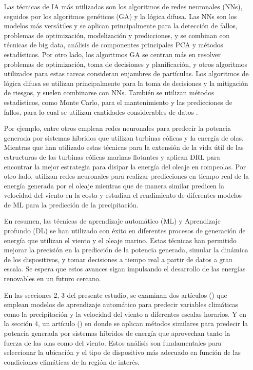 \documentclass[12pt]{article}
\begin{document}
Las técnicas de IA más utilizadas son los algoritmos de redes neuronales (NNs), seguidos por los algoritmos genéticos (GA) y la lógica difusa. Las NNs son los modelos más versátiles y se aplican principalmente para la detección de fallos, problemas de optimización, modelización y predicciones, y se combinan con técnicas de big data, análisis de componentes principales PCA y métodos estadísticos. Por otro lado, los algoritmos GA se centran más en resolver problemas de optimización, toma de decisiones y planificación, y otros algoritmos utilizados para estas tareas consideran enjambres de partículas. Los algoritmos de lógica difusa se utilizan principalmente para la toma de decisiones y la mitigación de riesgos, y suelen combinarse con NNs. También se utilizan métodos estadísticos, como Monte Carlo, para el mantenimiento y las predicciones de fallos, para lo cual se utilizan cantidades considerables de datos \citep{Garcia}.

Por ejemplo, \citet{Mahsa, Chen,Zheng} entre otros emplean redes neuronales para predecir la potencia generada por sistemas híbridos que utilizan turbinas eólicas y la energía de olas. Mientras que \citep{yeter} han utilizado estas técnicas para la extensión de la vida útil de las estructuras de las turbinas eólicas marinas flotantes \citep{yeter} y \citet{Xie} aplican DRL para encontrar la mejor estrategia para disipar la energía del oleaje en rompeolas. 
Por otro lado, \citet{Li} utilizan redes neuronales para realizar predicciones en tiempo real de la energía generada por el oleaje mientras que \citet{Li2} de manera similar predicen la velocidad del viento en la costa y \citep{Manuel} estudian el rendimiento de diferentes modelos de ML para la predicción de la precipitación.

En resumen, las técnicas de aprendizaje automático (ML) y Aprendizaje profundo (DL) se han utilizado con éxito en diferentes procesos de generación de energía que utilizan el viento y el oleaje marino. Estas técnicas han permitido mejorar la precisión en la predicción de la potencia generada, simular la dinámica de los dispositivos, y tomar decisiones a tiempo real a partir de datos a gran escala. Se espera que estos avances sigan impulsando el desarrollo de las energías renovables en un futuro cercano.

En las secciones 2, 3  del presente estudio, se examinan dos artículos (\cite{Manuel,Li2}) que emplean modelos de aprendizaje automático para predecir variables climáticas como la precipitación y  la velocidad del viento a diferentes escalas horarios. Y en la sección 4, un artículo (\cite{Mahsa}) en donde se aplican métodos similares para predecir la potencia generada por sistemas híbridos de energía que aprovechan tanto la fuerza de las olas como del viento. Estos análisis son fundamentales para seleccionar la ubicación y el tipo de dispositivo más adecuado en función de las condiciones climáticas de la región de interés.
\end{document}
